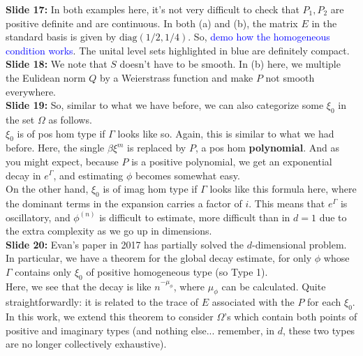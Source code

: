 \documentclass[11pt]{article}
\begin{document}
\noindent \textbf{Slide 17:} In both examples here, it's not very difficult to check that $P_1, P_2$ are positive definite and are continuous.  In both (a) and (b), the matrix $E$ in the standard basis is given by $\text{diag}(1/2, 1/4)$. So, \textcolor{blue}{demo how the homogeneous condition works}. The unital level sets highlighted in blue are definitely compact. \\




\noindent \textbf{Slide 18:} We note that $S$ doesn't have to be smooth. In (b) here, we multiple the Eulidean norm $Q$ by a Weierstrass function and make $P$ not smooth everywhere. \\




\noindent \textbf{Slide 19:} So, similar to what we have before, we can also categorize some $\xi_0$ in the set $\Omega$ as follows.\\

$\xi_0$ is of pos hom type if $\Gamma$ looks like so. Again, this is similar to what we had before. Here, the single $\beta \xi^m$ is replaced by $P$, a pos hom \textbf{polynomial}. And as you might expect, because $P$ is a positive polynomial, we get an exponential decay in $e^\Gamma$, and estimating $\phi$ becomes somewhat easy. \\

On the other hand, $\xi_0$ is of imag hom type if $\Gamma$ looks like this formula here, where the dominant terms in the expansion carries a factor of $i$. This means that $e^\Gamma$ is oscillatory, and $\phi^{(n)}$ is difficult to estimate, more difficult than in $d=1$ due to the extra complexity as we go up in dimensions.\\








\noindent \textbf{Slide 20:} Evan's paper in 2017 has partially solved the $d$-dimensional problem. In particular, we have a theorem for the global decay estimate, for only $\phi$ whose $\Gamma$ contains only $\xi_0$ of positive homogeneous type (so Type 1). \\

Here, we see that the decay is like $n^{-\mu_\phi}$, where $\mu_\phi$ can be calculated. Quite straightforwardly: it is related to the trace of $E$ associated with the $P$ for each $\xi_0$. \\

In this work, we extend this theorem to consider $\Omega$'s which contain both points of positive and imaginary types (and nothing else... remember, in $d$, these two types are no longer collectively exhaustive). \\
 
\end{document}
